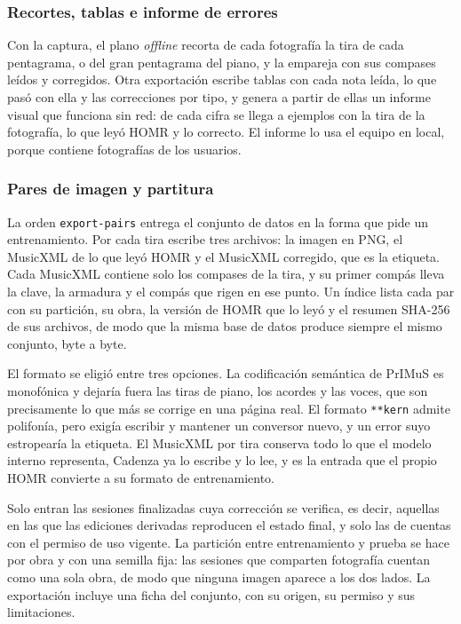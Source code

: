 \documentclass[conference]{IEEEtran}
\begin{document}
\subsubsection{Recortes, tablas e informe de errores}
Con la captura, el plano \textit{offline} recorta de cada fotografía la
tira de cada pentagrama, o del gran pentagrama del piano, y la empareja con
sus compases leídos y corregidos. Otra exportación escribe tablas con cada
nota leída, lo que pasó con ella y las correcciones por tipo, y genera a
partir de ellas un informe visual que funciona sin red: de cada cifra se
llega a ejemplos con la tira de la fotografía, lo que leyó HOMR y lo
correcto. El informe lo usa el equipo en local, porque contiene
fotografías de los usuarios.

\subsubsection{Pares de imagen y partitura}
La orden \texttt{export-pairs} entrega el conjunto de datos en la forma
que pide un entrenamiento. Por cada tira escribe tres archivos: la imagen
en PNG, el MusicXML de lo que leyó HOMR y el MusicXML corregido, que es la
etiqueta. Cada MusicXML contiene solo los compases de la tira, y su primer
compás lleva la clave, la armadura y el compás que rigen en ese punto. Un
índice lista cada par con su partición, su obra, la versión de HOMR que lo
leyó y el resumen SHA-256 de sus archivos, de modo que la misma base de
datos produce siempre el mismo conjunto, byte a byte.

El formato se eligió entre tres opciones. La codificación semántica de
PrIMuS es monofónica y dejaría fuera las tiras de piano, los acordes y las
voces, que son precisamente lo que más se corrige en una página real. El
formato \texttt{**kern} admite polifonía, pero exigía escribir y mantener
un conversor nuevo, y un error suyo estropearía la etiqueta. El MusicXML
por tira conserva todo lo que el modelo interno representa, Cadenza ya lo
escribe y lo lee, y es la entrada que el propio HOMR convierte a su
formato de entrenamiento.

Solo entran las sesiones finalizadas cuya corrección se verifica, es
decir, aquellas en las que las ediciones derivadas reproducen el estado
final, y solo las de cuentas con el permiso de uso vigente. La partición
entre entrenamiento y prueba se hace por obra y con una semilla fija: las
sesiones que comparten fotografía cuentan como una sola obra, de modo que
ninguna imagen aparece a los dos lados. La exportación incluye una ficha
del conjunto, con su origen, su permiso y sus limitaciones.
\end{document}
